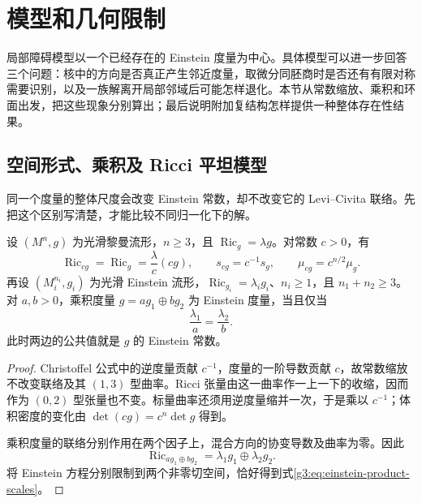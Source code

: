 
% 
% 
% 

\section{模型和几何限制}
\label{g3:sec:2504}

局部障碍模型以一个已经存在的 Einstein 度量为中心。具体模型可以进一步回答三个问题：核中的方向是否真正产生邻近度量，取微分同胚商时是否还有有限对称需要识别，以及一族解离开局部邻域后可能怎样退化。本节从常数缩放、乘积和环面出发，把这些现象分别算出；最后说明附加复结构怎样提供一种整体存在性结果。

\subsection{空间形式、乘积及 Ricci 平坦模型}
\label{g3:subsec:2504:01}
同一个度量的整体尺度会改变 Einstein 常数，却不改变它的 Levi--Civita 联络。先把这个区别写清楚，才能比较不同归一化下的解。

\begin{proposition}\label{g3:prop:einstein-scaling-product}
	设 \((M^n,g)\) 为光滑黎曼流形，\(n\ge3\)，且 \(\operatorname{Ric}_g=\lambda g\)。对常数 \(c>0\)，有
	\[
		\operatorname{Ric}_{cg}=\operatorname{Ric}_g
		=\frac\lambda c(cg),\qquad
		s_{cg}=c^{-1}s_g,\qquad
		\mu_{cg}=c^{n/2}\mu_g.
	\]
	再设 \((M_i^{n_i},g_i)\) 为光滑 Einstein 流形，\(\operatorname{Ric}_{g_i}=\lambda_i g_i\)、\(n_i\ge1\)，且 \(n_1+n_2\ge3\)。对 \(a,b>0\)，乘积度量 \(g=a g_1\oplus b g_2\) 为 Einstein 度量，当且仅当
	\begin{equation}\label{g3:eq:einstein-product-scales}
		\frac{\lambda_1}{a}=\frac{\lambda_2}{b}.
	\end{equation}
	此时两边的公共值就是 \(g\) 的 Einstein 常数。
\end{proposition}
\begin{proof}
	Christoffel 公式中的逆度量贡献 \(c^{-1}\)，度量的一阶导数贡献 \(c\)，故常数缩放不改变联络及其 \((1,3)\) 型曲率。Ricci 张量由这一曲率作一上一下的收缩，因而作为 \((0,2)\) 型张量也不变。标量曲率还须用逆度量缩并一次，于是乘以 \(c^{-1}\)；体积密度的变化由 \(\det(cg)=c^n\det g\) 得到。

	乘积度量的联络分别作用在两个因子上，混合方向的协变导数及曲率为零。因此
	\[
		\operatorname{Ric}_{a g_1\oplus b g_2}
		=\lambda_1g_1\oplus\lambda_2g_2.
	\]
	将 Einstein 方程分别限制到两个非零切空间，恰好得到式\eqref{g3:eq:einstein-product-scales}。
\end{proof}

